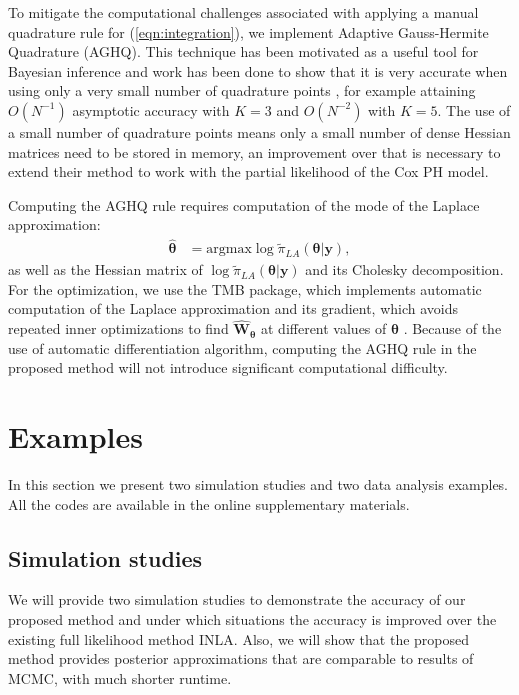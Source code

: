 \documentclass[ba]{imsart}
\begin{document}
To mitigate the computational challenges associated with applying a manual quadrature rule for (\ref{eqn:integration}), we implement Adaptive Gauss-Hermite Quadrature (AGHQ). This technique has been motivated as a useful tool for Bayesian inference \citep{nayloradaptive} and work has been done to show that it is very accurate when using only a very small number of quadrature points \citep{adaptive_GH_1994,adaptive_GH_2020}, for example attaining $O(N^{-1})$ asymptotic accuracy with $K = 3$ and $O(N^{-2})$ with $K = 5$. The use of a small number of quadrature points means only a small number of dense Hessian matrices need to be stored in memory, an improvement over \cite{casecross} that is necessary to extend their method to work with the partial likelihood of the Cox PH model.

Computing the AGHQ rule requires computation of the mode of the Laplace approximation:
\begin{equation}\begin{aligned}
\boldsymbol{\widehat{\theta}}&= \text{argmax}\log\widetilde{\pi}_{LA}(\boldsymbol{\theta}|\boldsymbol{y}),
\end{aligned}\end{equation}
as well as the Hessian matrix of $\log\widetilde{\pi}_{LA}(\boldsymbol{\theta}|\boldsymbol{y})$ and its Cholesky decomposition. For the optimization, we use the TMB package, which implements automatic computation of the Laplace approximation and its gradient, which avoids repeated inner optimizations to find $\boldsymbol{\widehat{W}_{\theta}}$ at different values of $\boldsymbol{\theta}$ \citep{tmb}. Because of the use of automatic differentiation algorithm, computing the AGHQ rule in the proposed method will not introduce significant computational difficulty.



\section{Examples}\label{sec:example}

In this section we present two simulation studies and two data analysis examples. All the codes are available in the online supplementary materials.

\subsection{Simulation studies}\label{subsec:sim}
We will provide two simulation studies to demonstrate the accuracy of our proposed method and under which situations the accuracy is improved over the existing full likelihood method INLA. Also, we will show that the proposed method provides posterior approximations that are comparable to results of MCMC, with much shorter runtime.
\end{document}
